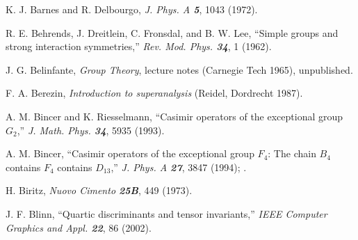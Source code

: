  K. J. Barnes and R. Delbourgo,
    {\em J. Phys. A  \bf 5}, 1043 (1972).

%


R. E. Behrends, J. Dreitlein, C. Fronsdal, and B. W. Lee,
``Simple groups and strong interaction symmetries,''
{\em Rev. Mod. Phys. \bf 34}, 1 (1962).


  J. G. Belinfante,
    {\em Group Theory}, lecture notes
    (Carnegie Tech 1965), unpublished.


 F. A. Berezin,
    {\em Introduction to superanalysis}
    (Reidel, Dordrecht 1987).


A. M. Bincer and K. Riesselmann,
``Casimir operators of the exceptional group $G_2$,''
{\em J. Math. Phys. \bf 34}, 5935 (1993).

 A. M. Bincer,
    ``Casimir operators of the exceptional group $F_4$:
    The chain $B_4$ contains $F_4$ contains $D_{13}$,''
    {\em J. Phys. A  \bf 27}, 3847 (1994);
    .

 H. Biritz,
    {\em Nuovo Cimento \bf 25B}, 449 (1973).

 J. F. Blinn,
    ``Quartic discriminants and tensor invariants,''
{\em IEEE Computer Graphics and Appl. \bf 22}, 86 (2002). %


